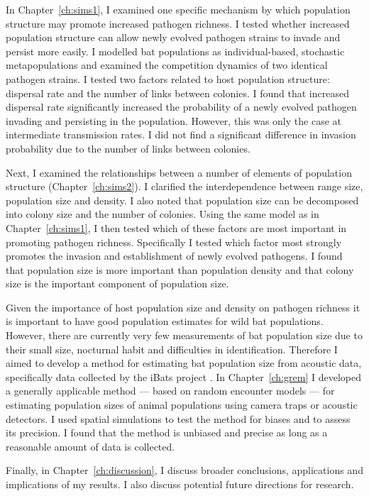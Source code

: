 In Chapter~\ref{ch:sims1}, I examined one specific mechanism by which population structure may promote increased pathogen richness.
I tested whether increased population structure can allow newly evolved pathogen strains to invade and persist more easily.
I modelled bat populations as individual-based, stochastic metapopulations and examined the competition dynamics of two identical pathogen strains.
I tested two factors related to host population structure: dispersal rate and the number of links between colonies.
I found that increased dispersal rate significantly increased the probability of a newly evolved pathogen invading and persisting in the population.
However, this was only the case at intermediate transmission rates.
I did not find a significant difference in invasion probability due to the number of links between colonies.


Next, I examined the relationships between a number of elements of population structure (Chapter~\ref{ch:sims2}).
I clarified the interdependence between range size, population size and density.
I also noted that population size can be decomposed into colony size and the number of colonies.
Using the same model as in Chapter~\ref{ch:sims1}, I then tested which of these factors are most important in promoting pathogen richness.
Specifically I tested which factor most strongly promotes the invasion and establishment of newly evolved pathogens.
I found that population size is more important than population density and that colony size is the important component of population size.


Given the importance of host population size and density on pathogen richness it is important to have good population estimates for wild bat populations.
However, there are currently very few measurements of bat population size due to their small size, nocturnal habit and difficulties in identification.
Therefore I aimed to develop a method for estimating bat population size from acoustic data, specifically data collected by the iBats project \cite{jones2011indicator}.
In Chapter~\ref{ch:grem} I developed a generally applicable method --- based on random encounter models \cite{rowcliffe2008estimating, yapp1956theory} --- for estimating population sizes of animal populations using camera traps or acoustic detectors.
I used spatial simulations to test the method for biases and to assess its precision.
I found that the method is unbiased and precise as long as a reasonable amount of data is collected.



Finally, in Chapter~\ref{ch:discussion}, I discuss broader conclusions, applications and implications of my results.
I also discuss potential future directions for research.












